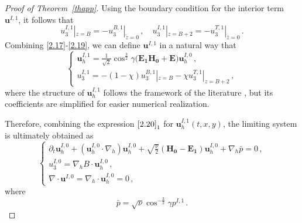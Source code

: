 \documentclass[pdflatex,sn-mathphys-num]{sn-jnl}%
\theoremstyle{thmstyleone}%
\theoremstyle{thmstyletwo}%
\theoremstyle{thmstylethree}%
\theoremstyle{thmstyletwo}
\begin{document}
\begin{proof}[Proof of Theorem~{\upshape\ref{thapp}}]
Using the boundary condition for the interior term $\boldsymbol{u}^{I,1}$, it follows that 
\begin{equation}\label{2.19}
		u_3^{I,1}|_{z=B}=-u_3^{B,1}|_{\tilde{z}=0}\,,\quad
		u_3^{I,1}|_{z=B+2}=-u_3^{T,1}|_{\bar{z}=0}\,.
\end{equation}
Combining \eqref{2.17}-\eqref{2.19}, we can define $\boldsymbol{u}^{I,1}$ in a natural way that
\begin{equation}\label{2.20}
	\begin{cases}
		\boldsymbol u_h^{I,1}
		=\tfrac{1}{\sqrt{2}}
		\cos^{\frac32}\gamma
		\big(
		\boldsymbol{E_1}\boldsymbol{H_0}+\boldsymbol{E}	
		\big)\boldsymbol{u}^{I,0}_h\,,\\
		u_3^{I,1}
		=
		-(1-\chi)	u_3^{B,1}|_{z=B}-\chi	u_3^{T,1}|_{z=B+2}\,,
	\end{cases}
\end{equation}
where the structure of $\boldsymbol u_h^{I,1}$ follows the framework of the literature \cite{Jia2024}, but its coefficients are simplified for easier numerical realization.


 

Therefore, combining the expression $\eqref{2.20}_1$ for $\boldsymbol{u}^{I,1}_h(t,x,y)$, the limiting system is ultimately obtained as
\begin{equation}\label{2.21}
	\begin{cases}
		\partial_{t} \boldsymbol{u}^{I,0}_h+(\boldsymbol{u}^{I,0}_h \cdot \nabla_h) \boldsymbol{u}^{I,0}_h
		+\sqrt{\frac{\nu}{2}}
		(\boldsymbol{H_0}
		-\boldsymbol{E_1})
		\boldsymbol{u}^{I,0}_h+\nabla_h\bar{p}=0\,,\\
		u^{I,0}_3=\nabla_h{B}\cdot\boldsymbol{u}^{I,0}_h\,,\\
		\nabla\cdot \boldsymbol{u}^{I,0}=\nabla_h \cdot \boldsymbol{u}^{I,0}_h=0\,,
	\end{cases}
\end{equation}
where 
\begin{equation}\label{2.22}
	\bar{p}=\sqrt{\nu}\cos^{-\frac32}\gamma
	{p}^{I,1}\,.
\end{equation}






\end{proof}
\end{document}
